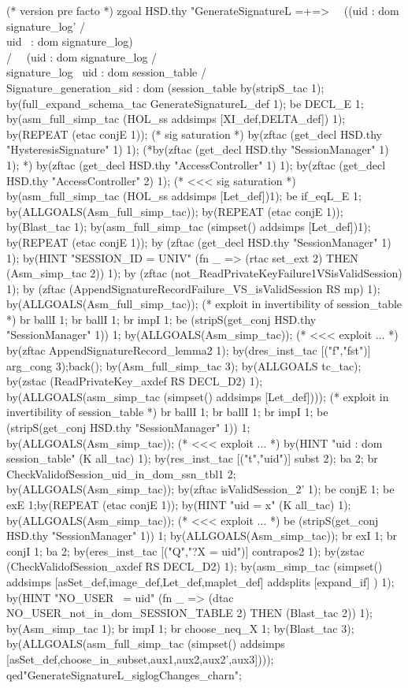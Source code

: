 \documentclass[a4paper,pdftex]{article}
\newenvironment{holz-proof}{\comment}{\endcomment}
\begin{document}
\begin{holz-proof}
(* version pre facto *)
zgoal HSD.thy
"GenerateSignatureL =+=>                                                        \
\ ((uid : dom signature_log' /\\ uid ~: dom signature_log) \\/                  \
\  (uid : dom signature_log  /\\ signature_log %
\  uid : dom session_table /\\ Signature_generation_sid : dom (session_table %
by(stripS_tac 1);
by(full_expand_schema_tac GenerateSignatureL_def 1);
be DECL_E 1;
by(asm_full_simp_tac (HOL_ss addsimps [XI_def,DELTA_def]) 1); 
by(REPEAT (etac conjE 1));
(* sig saturation *)
by(zftac (get_decl HSD.thy "HysteresisSignature" 1) 1);
(*by(zftac (get_decl HSD.thy "SessionManager" 1) 1); *)
by(zftac (get_decl HSD.thy "AccessController" 1) 1);
by(zftac (get_decl HSD.thy "AccessController" 2) 1);
(* <<< sig saturation *)
by(asm_full_simp_tac (HOL_ss addsimps [Let_def])1);
be if_eqL_E 1;
by(ALLGOALS(Asm_full_simp_tac));
by(REPEAT (etac conjE 1));
by(Blast_tac 1);
by(asm_full_simp_tac (simpset() addsimps [Let_def])1);
by(REPEAT (etac conjE 1));
by (zftac (get_decl HSD.thy "SessionManager" 1) 1);
by(HINT "SESSION_ID = UNIV" (fn _ => (rtac set_ext 2) THEN (Asm_simp_tac 2)) 1);
by (zftac (not_ReadPrivateKeyFailure1VSisValidSession) 1);
by (zftac (AppendSignatureRecordFailure_VS_isValidSession RS mp) 1);
by(ALLGOALS(Asm_full_simp_tac));
(* exploit in invertibility of session_table *)
br ballI 1; br ballI 1; br impI 1;
be (stripS(get_conj HSD.thy "SessionManager" 1)) 1;
by(ALLGOALS(Asm_simp_tac));
(* <<< exploit ... *)
by(zftac AppendSignatureRecord_lemma2 1);
by(dres_inst_tac [("f","fst")] arg_cong 3);back();
by(Asm_full_simp_tac 3);
by(ALLGOALS tc_tac);
by(zstac (ReadPrivateKey_axdef RS DECL_D2) 1);
by(ALLGOALS(asm_simp_tac (simpset() addsimps [Let_def])));
(* exploit in invertibility of session_table *)
br ballI 1; br ballI 1; br impI 1;
be (stripS(get_conj HSD.thy "SessionManager" 1)) 1;
by(ALLGOALS(Asm_simp_tac));
(* <<< exploit ... *)
by(HINT "uid : dom session_table" (K all_tac) 1);
by(res_inst_tac [("t","uid")] subst 2); ba 2;
br CheckValidofSession_uid_in_dom_ssn_tbl1 2;
by(ALLGOALS(Asm_simp_tac));
by(zftac isValidSession_2' 1);
be conjE 1; be exE 1;by(REPEAT (etac conjE 1));
by(HINT "uid = x" (K all_tac) 1);
by(ALLGOALS(Asm_simp_tac));
(* <<< exploit ... *)
be (stripS(get_conj HSD.thy "SessionManager" 1)) 1;
by(ALLGOALS(Asm_simp_tac));
br exI 1; br conjI 1; ba 2;
by(eres_inst_tac [("Q","?X = uid")] contrapos2 1);
by(zstac (CheckValidofSession_axdef RS DECL_D2) 1);
by(asm_simp_tac (simpset()  
                 addsimps  [asSet_def,image_def,Let_def,maplet_def]
                 addsplits [expand_if] ) 1);
by(HINT "NO_USER ~= uid"  (fn _ => (dtac NO_USER_not_in_dom_SESSION_TABLE 2)
                              THEN (Blast_tac 2))   1);
by(Asm_simp_tac 1);
br impI 1;
br choose_neq_X 1;
by(Blast_tac 3);
by(ALLGOALS(asm_full_simp_tac (simpset() addsimps 
                               [asSet_def,choose_in_subset,aux1,aux2,aux2',aux3])));
qed"GenerateSignatureL_siglogChanges_charn";




\end{holz-proof}
\end{document}
